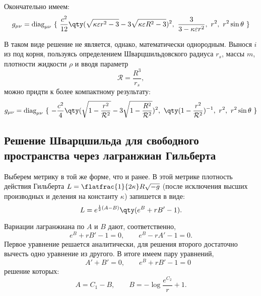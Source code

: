 \documentclass[\docroot/reports/draft/report.tex]{subfiles}
\begin{document}
    Окончательно имеем:
    \begin{equation}
        g_{\mu\nu} = \text{diag}_{\mu\nu}\ \{\
            \frac{c^2}{12} \qty(\sqrt{\kappa \varepsilon r^2 - 3} - 3 \sqrt{\kappa \varepsilon R^2 - 3})^2,\
            \frac{3}{3 - \kappa \varepsilon r^2},\
            r^2,\
            r^2 \sin\theta
        \ \}
    \end{equation}

    В таком виде решение не является, однако, математически однородным. Вынося $i$ из под корня, пользуясь определением Шварцшильдовского радиуса $r_s$, массы $m$, плотности жидкости $\rho$ и вводя параметр
    \begin{equation*}
        \mathcal{R} = \frac{R^3}{r_s} ,
    \end{equation*}
    можно придти к более компактному результату:
    \begin{equation}
        g_{\mu\nu} = \text{diag}_{\mu\nu}\ \{\
            - \frac{c^2}{4} \qty(\sqrt{1 - \frac{r^2}{\mathcal{R}^2}} - 3 \sqrt{1 - \frac{R^2}{\mathcal{R}^2}})^2,\
            \qty(1 - \frac{r^2}{\mathcal{R}^2})^{-1},\
            r^2,\
            r^2 \sin\theta
        \ \}
    \end{equation}

\subsection{Решение Шварцшильда для свободного пространства через лагранжиан Гильберта}

    Выберем метрику в той же форме, что и ранее. В этой метрике плотность действия Гильберта $L = \flatfrac{1}{2 \kappa} R \sqrt{-g}$ (после исключения высших производных и деления на константу $\kappa$) запишется в виде:
    \begin{equation*}
        L = e^{\frac{1}{2} (A - B)} \qty(e^B + r B' - 1) .
    \end{equation*}

    Вариации лагранжиана по $A$ и $B$ дают, соответственно,
    \begin{equation*}
        e^B + r B' - 1 = 0 , \qquad e^B - r A' - 1 = 0 .
    \end{equation*}
    Первое уравнение решается аналитически, для решения второго достаточно вычесть одно уравнение из другого. В итоге имеем пару уравнений,
    \begin{equation*}
        \qquad A' + B' = 0 , \qquad e^B + r B' - 1 = 0
    \end{equation*}
    решение которых:
    \begin{equation*}
        A = C_1 - B , \qquad B = - \log{\frac{e^{C_2}}{r} + 1} .
    \end{equation*}
\end{document}
